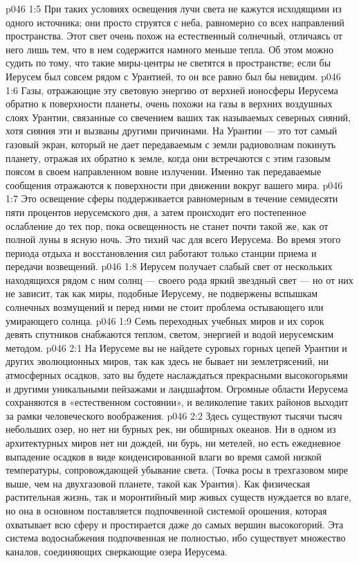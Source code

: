 \vs p046 1:5 При таких условиях освещения лучи света не кажутся исходящими из одного источника; они просто струятся с неба, равномерно со всех направлений пространства. Этот свет очень похож на естественный солнечный, отличаясь от него лишь тем, что в нем содержится намного меньше тепла. Об этом можно судить по тому, что такие миры\hyp{}центры не светятся в пространстве; если бы Иерусем был совсем рядом с Урантией, то он все равно был бы невидим.
\vs p046 1:6 Газы, отражающие эту световую энергию от верхней ионосферы Иерусема обратно к поверхности планеты, очень похожи на газы в верхних воздушных слоях Урантии, связанные со свечением ваших так называемых северных сияний, хотя сияния эти и вызваны другими причинами. На Урантии --- это тот самый газовый экран, который не дает передаваемым с земли радиоволнам покинуть планету, отражая их обратно к земле, когда они встречаются с этим газовым поясом в своем направленном вовне излучении. Именно так передаваемые сообщения отражаются к поверхности при движении вокруг вашего мира.
\vs p046 1:7 Это освещение сферы поддерживается равномерным в течение семидесяти пяти процентов иерусемского дня, а затем происходит его постепенное ослабление до тех пор, пока освещенность не станет почти такой же, как от полной луны в ясную ночь. Это тихий час для всего Иерусема. Во время этого периода отдыха и восстановления сил работают только станции приема и передачи возвещений.
\vs p046 1:8 \pc Иерусем получает слабый свет от нескольких находящихся рядом с ним солнц --- своего рода яркий звездный свет --- но от них не зависит, так как миры, подобные Иерусему, не подвержены вспышкам солнечных возмущений и перед ними не стоит проблема остывающего или умирающего солнца.
\vs p046 1:9 Семь переходных учебных миров и их сорок девять спутников снабжаются теплом, светом, энергией и водой иерусемским методом.
\vs p046 2:1 На Иерусеме вы не найдете суровых горных цепей Урантии и других эволюционных миров, так как здесь не бывает ни землетрясений, ни атмосферных осадков, зато вы будете наслаждаться прекрасными высокогорьями и другими уникальными пейзажами и ландшафтом. Огромные области Иерусема сохраняются в «естественном состоянии», и великолепие таких районов выходит за рамки человеческого воображения.
\vs p046 2:2 Здесь существуют тысячи тысяч небольших озер, но нет ни бурных рек, ни обширных океанов. Ни в одном из архитектурных миров нет ни дождей, ни бурь, ни метелей, но есть ежедневное выпадение осадков в виде конденсированной влаги во время самой низкой температуры, сопровождающей убывание света. (Точка росы в трехгазовом мире выше, чем на двухгазовой планете, такой как Урантия). Как физическая растительная жизнь, так и моронтийный мир живых существ нуждается во влаге, но она в основном поставляется подпочвенной системой орошения, которая охватывает всю сферу и простирается даже до самых вершин высокогорий. Эта система водоснабжения подпочвенная не полностью, ибо существует множество каналов, соединяющих сверкающие озера Иерусема.
